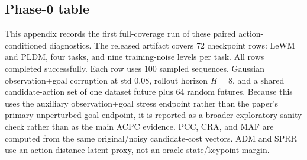 \documentclass[10pt]{article}
\begin{document}
\subsection{Phase-0 table}

This appendix records the first full-coverage run of these paired action-conditioned diagnostics. The released artifact covers 72 checkpoint rows: LeWM and PLDM, four tasks, and nine training-noise levels per task. All rows completed successfully. Each row uses $100$ sampled sequences, Gaussian observation+goal corruption at std $0.08$, rollout horizon $H=8$, and a shared candidate-action set of one dataset future plus $64$ random futures. Because this uses the auxiliary observation+goal stress endpoint rather than the paper's primary unperturbed-goal endpoint, it is reported as a broader exploratory sanity check rather than as the main ACPC evidence. PCC, CRA, and MAF are computed from the same original/noisy candidate-cost vectors. ADM and SPRR use an action-distance latent proxy, not an oracle state/keypoint margin.
\end{document}
